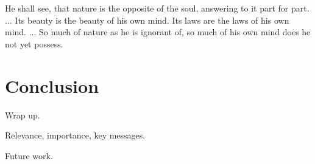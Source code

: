 \begin{savequote}[75mm]
He shall see, that nature is the opposite of the soul, answering to it part for part. ... Its beauty is the beauty of his own mind. Its laws are the laws of his own mind. ... So much of nature as he is ignorant of, so much of his own mind does he not yet possess.
\end{savequote}

\chapter{Conclusion}
\label{conclusion}

Wrap up.

Relevance, importance, key messages.

Future work.